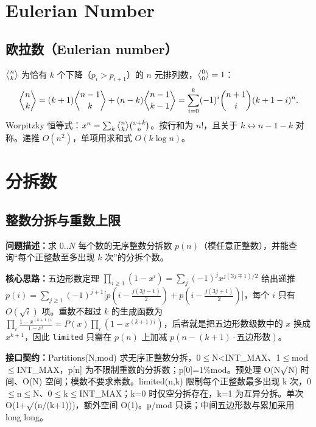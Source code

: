 \Needspace{180pt}

\section{Eulerian Number}

\subsection{欧拉数（Eulerian number）}\label{knowledge-eulerian}
$\genfrac{\langle}{\rangle}{0pt}{}{n}{k}$ 为恰有 $k$ 个下降（$p_i>p_{i+1}$）的 $n$ 元排列数，$\genfrac{\langle}{\rangle}{0pt}{}{0}{0}=1$：
\[
\genfrac{\langle}{\rangle}{0pt}{}{n}{k}=(k+1)\genfrac{\langle}{\rangle}{0pt}{}{n-1}{k}+(n-k)\genfrac{\langle}{\rangle}{0pt}{}{n-1}{k-1}
=\sum_{i=0}^{k}(-1)^i\binom{n+1}{i}(k+1-i)^n.
\]
Worpitzky 恒等式：$x^n=\sum_{k}\genfrac{\langle}{\rangle}{0pt}{}{n}{k}\binom{x+k}{n}$。按行和为 $n!$，且关于 $k\leftrightarrow n-1-k$ 对称。递推 $O(n^2)$，单项用求和式 $O(k\log n)$。



\Needspace{680pt}

\section{分拆数}

\subsection{整数分拆与重数上限}\label{compact-Partitions}

\noindent\textbf{问题描述：}\allowbreak 求 $0..N$ 每个数的无序整数分拆数 $p(n)$（模任意正整数），并能查询“每个正整数至多出现 $k$ 次”的分拆个数。

\textbf{核心思路：}\allowbreak 五边形数定理 $\prod_{i\ge1}(1-x^i)=\sum_j(-1)^jx^{j(3j\mp1)/2}$ 给出递推 $p(i)=\sum_{j\ge1}(-1)^{j+1}\bigl[p(i-\tfrac{j(3j-1)}2)+p(i-\tfrac{j(3j+1)}2)\bigr]$，每个 $i$ 只有 $O(\sqrt i)$ 项。重数不超过 $k$ 的生成函数为 $\prod_i\frac{1-x^{(k+1)i}}{1-x^i}=P(x)\prod_i(1-x^{(k+1)i})$，后者就是把五边形数级数中的 $x$ 换成 $x^{k+1}$，因此 \texttt{limited} 只需在 $p(n)$ 上加减 $p(n-(k+1)\cdot\text{五边形数})$。



{\sloppy{}\noindent\textbf{接口契约：}Partitions(N,mod) 求无序正整数分拆，0$\le$N<INT\_MAX、1$\le$mod$\le$INT\_MAX，p[n] 为不限制重数的分拆数；p[0]=1\%mod。预处理 O(N$\sqrt{\vphantom x}$N) 时间、O(N) 空间；模数不要求素数。limited(n,k) 限制每个正整数最多出现 k 次，0$\le$n$\le$N、0$\le$k$\le$INT\_MAX；k=0 时仅空分拆存在，k=1 为互异分拆。单次 O(1+$\sqrt{\vphantom x}$(n/(k+1)))，额外空间 O(1)。p/mod 只读；中间五边形数与累加采用 long long。\par}

